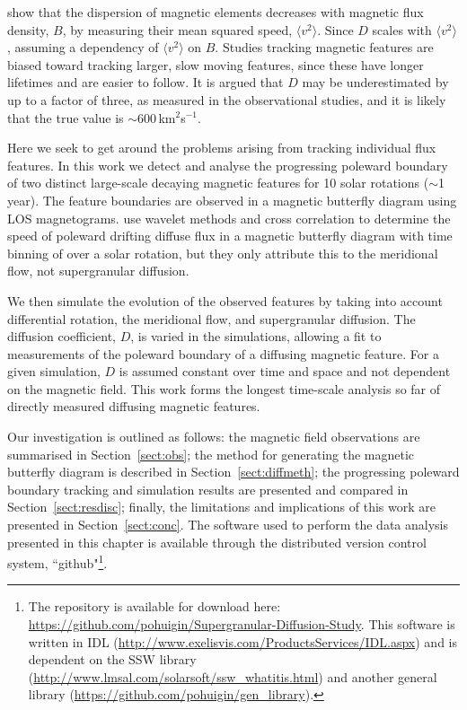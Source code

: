 \cite{Schrijver:1996} show that the dispersion of magnetic elements decreases with magnetic flux density, $B$, by measuring their mean squared speed, $\langle v^2 \rangle$. Since $D$ scales with $\langle v^2 \rangle$, assuming a dependency of $\langle v^2 \rangle$ on $B$. Studies tracking magnetic features are biased toward tracking larger, slow moving features, since these have longer lifetimes and are easier to follow. It is argued that $D$ may be underestimated by up to a factor of three, as measured in the observational studies, and it is likely that the true value is $\sim$600\,km$^2$s$^{-1}$. 

Here we seek to get around the problems arising from tracking individual flux features. In this work we detect and analyse the progressing poleward boundary of two distinct large-scale decaying magnetic features for 10 solar rotations ($\sim$1\,year). The feature boundaries are observed in a magnetic butterfly diagram \citep{Harvey:1992} using LOS magnetograms.  \cite{Svanda:2007} use wavelet methods and cross correlation to determine the speed of poleward drifting diffuse flux in a  magnetic butterfly diagram with time binning of over a solar rotation, but they only attribute this to the meridional flow, not supergranular diffusion. %

We then simulate the evolution of the observed features by taking into account differential rotation, the meridional flow, and supergranular diffusion. The diffusion coefficient, $D$, is varied in the simulations, allowing a fit to measurements of the poleward boundary of a diffusing magnetic feature. For a given simulation, $D$ is assumed constant over time and space and not dependent on the magnetic field. This work forms the longest time-scale analysis so far of directly measured diffusing magnetic features.

Our investigation is outlined as follows: the magnetic field observations are summarised in Section~\ref{sect:obs}; the method for generating the magnetic butterfly diagram is described in Section~\ref{sect:diffmeth}; the progressing poleward boundary tracking and simulation results are presented and compared in Section~\ref{sect:resdisc}; finally, the limitations and implications of this work are presented in Section~\ref{sect:conc}. The software used to perform the data analysis presented in this chapter is available through the distributed version control system, ``github"\footnote{The repository is available for download here: \url{https://github.com/pohuigin/Supergranular-Diffusion-Study}. This software is written in IDL (\url{http://www.exelisvis.com/ProductsServices/IDL.aspx}) and is dependent on the SSW library (\url{http://www.lmsal.com/solarsoft/ssw\_whatitis.html}) and another general library (\url{https://github.com/pohuigin/gen\_library}).}.

